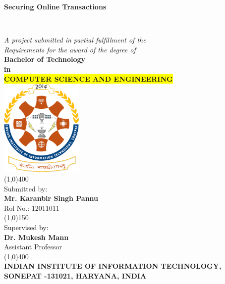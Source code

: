 \documentclass[12pt, oneside, a4paper]{article}
\begin{document}
\begin{center}
    \vspace{0.1cm}
    \begin{Large}\textbf{Securing Online Transactions}\end{Large}\\
    \vspace{0.8cm}\begin{large}
    \textit{A project submitted in partial fulfillment of the\\
    Requirements for the award of the degree of}\\
    \vspace{0.8cm}
    \textbf{Bachelor of Technology\\ in}\\
    \textbf{\colorbox{yellow}{COMPUTER SCIENCE AND ENGINEERING}}\\
    \vspace{1cm}
    \includegraphics[width=0.3\textwidth]{Clg_logo.png}\\
    \vspace{0.8cm}
    \line(1,0){400}\\\vspace{0.3cm}
    Submitted by:\\
    \textbf{Mr. Karanbir Singh Pannu}\\Rol No.: 12011011\\
    \vspace{0.5cm}
    \line(1,0){150}\\
    \vspace{0.5cm}
    Supervised by:\\
    \textbf{Dr. Mukesh Mann}\\
    Assistant Professor\\
    \line(1,0){400}\\
    \vspace{2cm}
    \textbf{INDIAN INSTITUTE OF INFORMATION TECHNOLOGY,\\
    SONEPAT -131021, HARYANA, INDIA}\\\end{large}
\end{center}
\end{document}
